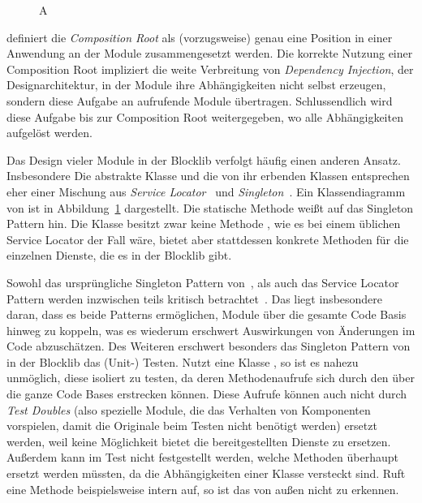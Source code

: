\begin{figure}
  \begin{center}
    
  \end{center}
  \caption{A}\label{fig:diagContext}
\end{figure}
\textcite[S.~76]{Seemann2012} definiert die \emph{Composition Root} als (vorzugsweise) genau eine Position in einer Anwendung an der Module zusammengesetzt werden. Die korrekte Nutzung einer Composition Root impliziert die weite Verbreitung von \emph{Dependency Injection}, der Designarchitektur, in der Module ihre Abhängigkeiten nicht selbst erzeugen, sondern diese Aufgabe an aufrufende Module übertragen. Schlussendlich wird diese Aufgabe bis zur Composition Root weitergegeben, wo alle Abhängigkeiten aufgelöst werden. 


Das Design vieler Module in der Blocklib verfolgt häufig einen anderen Ansatz. Insbesondere Die abstrakte Klasse  und die von ihr erbenden Klassen entsprechen eher einer Mischung aus \emph{Service Locator}~\cite[S.~301~ff.]{Nystrom2015} und \emph{Singleton}~\cite[S.~103~ff.]{Nystrom2015}. Ein Klassendiagramm von  ist in Abbildung~\ref{fig:diagContext} dargestellt. Die statische Methode  weißt auf das Singleton Pattern hin. Die Klasse besitzt zwar keine Methode , wie es bei einem üblichen Service Locator der Fall wäre, bietet aber stattdessen konkrete Methoden für die einzelnen Dienste, die es in der Blocklib gibt.

Sowohl das ursprüngliche Singleton Pattern von~\textcite[S.~127~ff.]{Gamma2016}, als auch das Service Locator Pattern werden inzwischen teils kritisch betrachtet~\cite[S.~103~ff.]{Nystrom2015}\cite[S.~154~ff.]{Seemann2012}. Das liegt insbesondere daran, dass es beide Patterns ermöglichen, Module über die gesamte Code Basis hinweg zu koppeln, was es wiederum erschwert Auswirkungen von Änderungen im Code abzuschätzen. Des Weiteren erschwert besonders das Singleton Pattern von  in der Blocklib das (Unit-) Testen. Nutzt eine Klasse , so ist es nahezu unmöglich, diese isoliert zu testen, da deren Methodenaufrufe sich durch den  über die ganze Code Bases erstrecken können. Diese  Aufrufe können auch nicht durch \emph{Test Doubles} (also spezielle Module, die das Verhalten von Komponenten vorspielen, damit die Originale beim Testen nicht benötigt werden) ersetzt werden, weil  keine Möglichkeit bietet die bereitgestellten Dienste zu ersetzen. Außerdem kann im Test nicht festgestellt werden, welche Methoden überhaupt ersetzt werden müssten, da die Abhängigkeiten einer Klasse versteckt sind. Ruft eine Methode beispielsweise intern  auf, so ist das von außen nicht zu erkennen.

